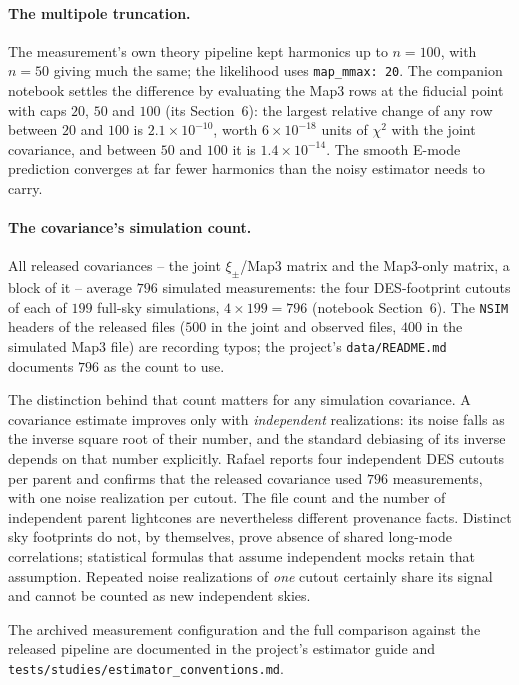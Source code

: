 \documentclass[11pt]{article}
\newcommand{\us}{\_\allowbreak}
\numberwithin{equation}{section}
\begin{document}
\paragraph{The multipole truncation.}
The measurement's own theory pipeline kept harmonics up to
$n = 100$, with $n = 50$ giving much the same; the likelihood uses
\texttt{map\us mmax: 20}.  The companion notebook settles the
difference by evaluating the Map3 rows at the fiducial point with
caps $20$, $50$ and $100$ (its Section~6): the largest relative
change of any row between $20$ and $100$ is $2.1\times 10^{-10}$,
worth $6\times 10^{-18}$ units of $\chi^2$ with the joint
covariance, and between $50$ and $100$ it is
$1.4\times 10^{-14}$.  The smooth E-mode prediction converges at
far fewer harmonics than the noisy estimator needs to carry.

\paragraph{The covariance's simulation count.}
All released covariances -- the joint $\xi_\pm$/Map3 matrix and
the Map3-only matrix, a block of it -- average $796$ simulated
measurements: the four DES-footprint cutouts of each of $199$
full-sky simulations, $4 \times 199 = 796$ (notebook Section~6).
The \texttt{NSIM} headers of the released files ($500$ in the
joint and observed files, $400$ in the simulated Map3 file) are
recording typos; the project's \texttt{data/README.md} documents
$796$ as the count to use.

The distinction behind that count matters for any simulation
covariance.  A covariance estimate improves only with
\emph{independent} realizations: its noise falls as the inverse
square root of their number, and the standard debiasing of its
inverse depends on that number explicitly.  Rafael reports four independent DES cutouts per parent and confirms
that the released covariance used $796$ measurements, with one noise
realization per cutout. The file count and the number of independent
parent lightcones are nevertheless different provenance facts. Distinct
sky footprints do not, by themselves, prove absence of shared long-mode
correlations; statistical formulas that assume independent mocks retain
that assumption. Repeated noise realizations of \emph{one} cutout
certainly share its signal and cannot be counted as new independent skies.

The archived measurement configuration and the full comparison
against the released pipeline are documented in the project's
estimator guide and
\texttt{tests/studies/estimator\us conventions.md}.
\end{document}
